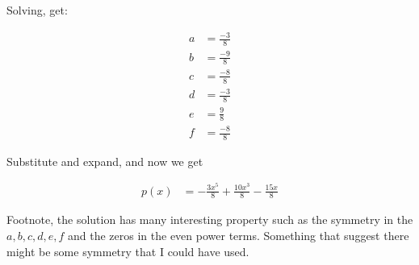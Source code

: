 Solving, get:

\begin{align*}
  a &= \frac{-3}{8} \\
  b &= \frac{-9}{8} \\
  c &= \frac{-8}{8} \\
  d &= \frac{-3}{8} \\
  e &= \frac{ 9}{8} \\
  f &= \frac{-8}{8}
\end{align*}

Substitute and expand, and now we get

\begin{align*}
  p(x) &= -\frac{3x^5}{8} + \frac{10x^3}{8} - \frac{15x}{8}
\end{align*}

Footnote, the solution has many interesting property such as the symmetry in the $ a, b, c, d, e, f $ and the zeros in the even power terms. Something that suggest there might be some symmetry that I could have used.
